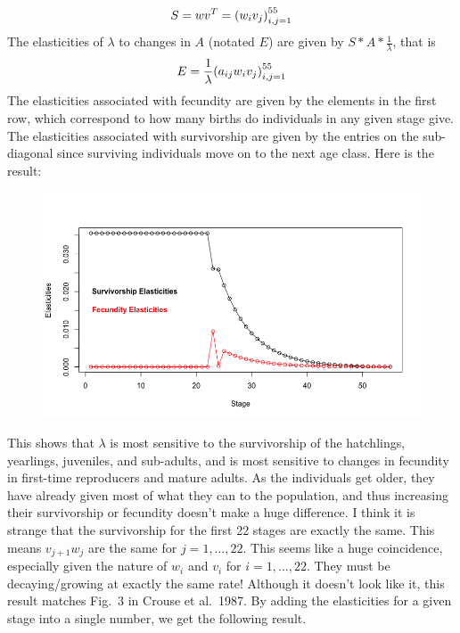 \documentclass{article} %
\theoremstyle{plain}
\numberwithin{equation}{section} %
\numberwithin{figure}{section} %
\numberwithin{table}{section} %
\begin{document}
\begin{enumerate}[\ \ (a)]
\begin{align*}
            S = wv^T = \qty(w_iv_j)_{i,j=1}^{55}
        \end{align*}
        The elasticities of $\lambda$ to changes in $A$ (notated $E$) are given by $S*A*\frac{1}{\lambda}$, that is
        \begin{align*}
            E = \frac{1}{\lambda}\qty(a_{ij}w_iv_j)_{i,j=1}^{55}
        \end{align*}
        The elasticities associated with fecundity are given by the elements in the first row, which correspond to how many births do individuals in any given stage give.  The elasticities associated with survivorship are given by the entries on the sub-diagonal since surviving individuals move on to the next age class.  Here is the result:
        \begin{figure}[ht!]
            \centering
            \includegraphics[scale=0.45]{figure_1d.png}
        \end{figure}
        \FloatBarrier
        This shows that $\lambda$ is most sensitive to the survivorship of the hatchlings, yearlings, juveniles, and sub-adults, and is most sensitive to changes in fecundity in first-time reproducers and mature adults.  As the individuals get older, they have already given most of what they can to the population, and thus increasing their survivorship or fecundity doesn't make a huge difference.  I think it is strange that the survivorship for the first 22 stages are exactly the same.  This means $v_{j+1}w_j$ are the same for $j=1,\dots,22$.  This seems like a huge coincidence, especially given the nature of $w_i$ and $v_i$ for $i=1,\dots,22$.  They must be decaying/growing at exactly the same rate!  Although it doesn't look like it, this result matches Fig.~3 in Crouse et al.~1987.  By adding the elasticities for a given stage into a single number, we get the following result.

\end{enumerate}
\end{document}
